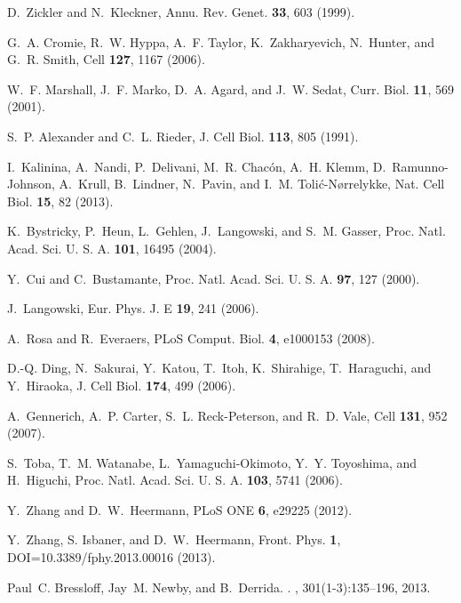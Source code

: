 \documentclass[aps,showpacs,twocolumn,floatfix,prx,superscriptaddress]{revtex4-1}
\begin{document}
\begin{thebibliography}{10}
D.~Zickler and
  N.~Kleckner,
  Annu. Rev. Genet. \textbf{33},
  603 (1999).

G.~A. Cromie,
  R.~W. Hyppa,
  A.~F. Taylor,
  K.~Zakharyevich,
  N.~Hunter, and
  G.~R. Smith,
  Cell \textbf{127}, 1167
  (2006).

W.~F. Marshall,
  J.~F. Marko,
  D.~A. Agard, and
  J.~W. Sedat,
  Curr. Biol. \textbf{11},
  569 (2001).

S.~P. Alexander
  and C.~L.
  Rieder, J. Cell Biol.
  \textbf{113}, 805 (1991).

I.~Kalinina,
  A.~Nandi,
  P.~Delivani,
  M.~R. Chac\'on,
  A.~H. Klemm,
  D.~Ramunno-Johnson,
  A.~Krull,
  B.~Lindner,
  N.~Pavin, and
  I.~M. Toli\'c-N{\o}rrelykke,
  Nat. Cell Biol. \textbf{15},
  82 (2013).

K.~Bystricky,
  P.~Heun,
  L.~Gehlen,
  J.~Langowski,
  and S.~M.
  Gasser, Proc. Natl. Acad. Sci. U. S. A.
  \textbf{101}, 16495
  (2004).

Y.~Cui and
  C.~Bustamante,
  Proc. Natl. Acad. Sci. U. S. A.
  \textbf{97}, 127 (2000).

J.~Langowski,
  Eur. Phys. J. E \textbf{19}, 241
  (2006).

A.~Rosa and
  R.~Everaers,
  PLoS Comput. Biol. \textbf{4},
  e1000153 (2008).

D.-Q. Ding,
  N.~Sakurai,
  Y.~Katou,
  T.~Itoh,
  K.~Shirahige,
  T.~Haraguchi,
  and Y.~Hiraoka,
  J. Cell Biol.
  \textbf{174}, 499 (2006).

A.~Gennerich,
  A.~P. Carter,
  S.~L. Reck-Peterson,
  and R.~D. Vale,
  Cell \textbf{131}, 952
  (2007).

S.~Toba,
  T.~M. Watanabe,
  L.~Yamaguchi-Okimoto,
  Y.~Y. Toyoshima,
  and H.~Higuchi,
  Proc. Natl. Acad. Sci. U. S. A.
  \textbf{103}, 5741 (2006).
  
 Y.~Zhang and D.~W.~Heermann, PLoS ONE \textbf{6}, e29225 (2012).
 
Y.~Zhang, S. Isbaner, and D.~W.~Heermann, Front. Phys. \textbf{1}, DOI=10.3389/fphy.2013.00016 (2013).

Paul~C. Bressloff, Jay~M. Newby, and B.~Derrida.
.
, 301(1-3):135--196, 2013.


\end{thebibliography}
\end{document}
